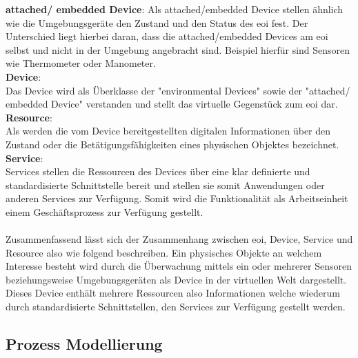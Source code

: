 \documentclass[a4paper, 12pt, twoside, headsepline=true]{scrartcl} %
\begin{document}
\textbf{attached/ embedded Device}: 
Als attached/embedded Device stellen ähnlich wie die Umgebungsgeräte den Zustand und den Status des \ac{eoi} fest. Der Unterschied liegt hierbei daran, dass die attached/embedded Devices am \ac{eoi} selbst und nicht in der Umgebung angebracht sind. Beispiel hierfür sind Sensoren wie Thermometer oder Manometer.
\\

\textbf{Device}: \\
Das Device wird als Überklasse der "environmental Devices" sowie der "attached/ embedded Device" verstanden und stellt das virtuelle Gegenstück zum \ac{eoi} dar.
\\

\textbf{Resource}: \\
Als werden die vom Device bereitgestellten digitalen Informationen über den Zustand oder die Betätigungsfähigkeiten eines physischen Objektes bezeichnet.
\\

\textbf{Service}: \\
Services stellen die Ressourcen des Devices über eine klar definierte und standardisierte Schnittstelle bereit und stellen sie somit Anwendungen oder anderen Services zur Verfügung. Somit wird die Funktionalität als Arbeitseinheit einem Geschäftsprozess zur Verfügung gestellt.
\\
\\
Zusammenfassend lässt sich der Zusammenhang zwischen \ac{eoi}, Device, Service und Resource also wie folgend beschreiben. Ein physisches Objekte an welchem Interesse besteht wird durch die Überwachung mittels ein oder mehrerer Sensoren beziehungsweise Umgebungsgeräten als Device in der virtuellen Welt dargestellt. Dieses Device enthält mehrere Ressourcen also Informationen welche wiederum durch standardisierte Schnittstellen, den Services zur Verfügung gestellt werden.

\subsection{Prozess Modellierung}
\end{document}
